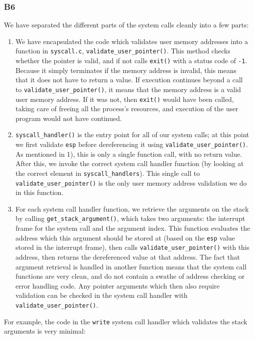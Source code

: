 \documentclass[a4wide, 11pt]{article}
\newcommand{\tx}{\texttt}
\begin{document}
\subsubsection{B6}

We have separated the different parts of the system calls cleanly into a few parts:

\begin{enumerate}
\item We have encapsulated the code which validates user memory addresses into a function in \tx{syscall.c}, \tx{validate\_user\_pointer()}. This method checks whether the pointer is valid, and if not calls \tx{exit()} with a status code of \tx{-1}. Because it simply terminates if the memory address is invalid, this means that it does not have to return a value. If execution continues beyond a call to \tx{validate\_user\_pointer()}, it means that the memory address is a valid user memory address. If it was not, then \tx{exit()} would have been called, taking care of freeing all the process's resources, and execution of the user program would not have continued.
\item \tx{syscall\_handler()} is the entry point for all of our system calls; at this point we first validate \tx{esp} before dereferencing it using \tx{validate\_user\_pointer()}. As mentioned in 1), this is only a single function call, with no return value. After this, we invoke the correct system call handler function (by looking at the correct element in \tx{syscall\_handlers}). This single call to \tx{validate\_user\_pointer()} is the only user memory address validation we do in this function.
\item For each system call handler function, we retrieve the arguments on the stack by calling \tx{get\_stack\_argument()}, which takes two arguments: the interrupt frame for the system call and the argument index. This function evaluates the address which this argument should be stored at (based on the \tx{esp} value stored in the interrupt frame), then calls \tx{validate\_user\_pointer()} with this address, then returns the dereferenced value at that address. The fact that argument retrieval is handled in another function means that the system call functions are very clean, and do not contain a swathe of address checking or error handling code. Any pointer arguments which then also require validation can be checked in the system call handler with \tx{validate\_user\_pointer()}.
\end{enumerate}

For example, the code in the \tx{write} system call handler which validates the stack arguments is very minimal:
\end{document}
